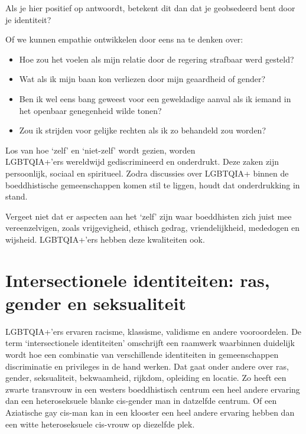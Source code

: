 \documentclass[12pt,openany]{book}
\begin{document}
Als je hier positief op antwoordt, betekent dit dan dat je geobsedeerd bent door je identiteit?

Of we kunnen empathie ontwikkelen door eens na te denken over:

\begin{itemize}
\setlength\itemsep{-0.3em}
\item Hoe zou het voelen als mijn relatie door de regering strafbaar werd gesteld?
\item Wat als ik mijn baan kon verliezen door mijn geaardheid of gender?
\item Ben ik wel eens bang geweest voor een geweldadige aanval als ik iemand in het openbaar genegenheid wilde tonen?
\item Zou ik strijden voor gelijke rechten als ik zo behandeld zou worden?
\end{itemize}

Los van hoe ‘zelf’ en ‘niet-zelf’ wordt gezien, worden \\ \noindent \mbox{LGBTQIA+’ers} wereldwijd gediscrimineerd en onderdrukt. Deze zaken zijn persoonlijk, sociaal en spiritueel. Zodra discussies over LGBTQIA+ binnen de boeddhistische gemeenschappen komen stil te liggen, houdt dat onderdrukking in stand.

Vergeet niet dat er aspecten aan het ‘zelf’ zijn waar boeddhisten zich juist mee vereenzelvigen, zoals vrijgevigheid, ethisch gedrag, vriendelijkheid, mededogen en wijsheid. LGBTQIA+’ers hebben deze kwaliteiten ook.

\section*{Intersectionele identiteiten: ras, gender en seksualiteit}

LGBTQIA+’ers ervaren racisme, klassisme, validisme en andere vooroordelen. De term ‘intersectionele identiteiten’ omschrijft een raamwerk waarbinnen duidelijk wordt hoe een combinatie van verschillende identiteiten in gemeenschappen discriminatie en privileges in de hand werken. Dat gaat onder andere over ras, gender, seksualiteit, bekwaamheid, rijkdom, opleiding en locatie. Zo heeft een zwarte transvrouw in een westers boeddhistisch centrum een heel andere ervaring dan een heteroseksuele blanke cis-gender man in datzelfde centrum. Of een Aziatische gay cis-man kan in een klooster een heel andere ervaring hebben dan een witte heteroseksuele cis-vrouw op diezelfde plek.
\end{document}
